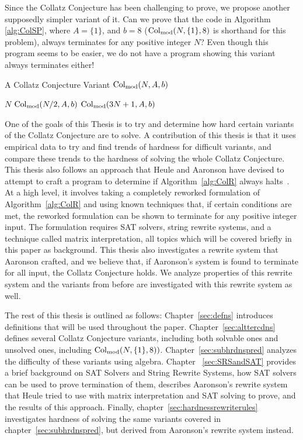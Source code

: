 Since the Collatz Conjecture has been challenging to prove, we propose another supposedly simpler variant of it. Can we prove that the code in Algorithm \ref{alg:ColSP}, where $A = \{1\}$, and $b = 8$ ($\mathrm{Col}_{\text{mod}}(N,\{1\},8)$ is shorthand for this problem), always terminates for any positive integer $N$? Even though this program seems to be easier, we do not have a program showing this variant always terminates either! \par
\begin{algorithm} 
\caption{A Collatz Conjecture Variant $\mathrm{Col}_{\text{mod}}(N,A,b)$}
\label{alg:ColSP} 
\begin{algorithmic}[1]
     \Return $N$
    \EndIf
     \Return $\mathrm{Col}_{\text{mod}}(N/2,A,b)$
    \EndIf
    \State \Return $\mathrm{Col}_{\text{mod}}(3N+1,A,b)$ 
\end{algorithmic}
\end{algorithm}
One of the goals of this Thesis is to try and determine how hard certain variants of the Collatz Conjecture are to solve. A contribution of this thesis is that it uses empirical data to try and find trends of hardness for difficult variants, and compare these trends to the hardness of solving the whole Collatz Conjecture. This thesis also follows an approach that Heule and Aaronson have devised to attempt to craft a program to determine if Algorithm~\ref{alg:ColR} always halts~\cite{HeuleAaronson}. At a high level, it involves taking a completely reworked formulation of Algorithm~\ref{alg:ColR} and using known techniques that, if certain conditions are met, the reworked formulation can be shown to terminate for any positive integer input. The formulation requires SAT solvers, string rewrite systems, and a technique called matrix interpretation, all topics which will be covered briefly in this paper as background. This thesis also investigates a rewrite system that Aaronson crafted, and we believe that, if Aaronson's system is found to terminate for all input, the Collatz Conjecture holds. We analyze properties of this rewrite system and the variants from before are investigated with this rewrite system as well.\par
The rest of this thesis is outlined as follows: Chapter~\ref{sec:defns} introduces definitions that will be used throughout the paper. Chapter~\ref{sec:alttercdns} defines several Collatz Conjecture variants, including both solvable ones and unsolved ones, including $\mathrm{Col}_{\text{mod}}(N,\{1\},8))$. Chapter~\ref{sec:subhrdnspred} analyzes the difficulty of these variants using algebra. Chapter ~\ref{sec:SRSandSAT} provides a brief background on SAT Solvers and String Rewrite Systems, how SAT solvers can be used to prove termination of them, describes Aaronson's rewrite system that Heule tried to use with matrix interpretation and SAT solving to prove, and the results of this approach. Finally, chapter~\ref{sec:hardnessrewriterules} investigates hardness of solving the same variants covered in chapter~\ref{sec:subhrdnspred}, but derived from Aaronson's rewrite system instead.